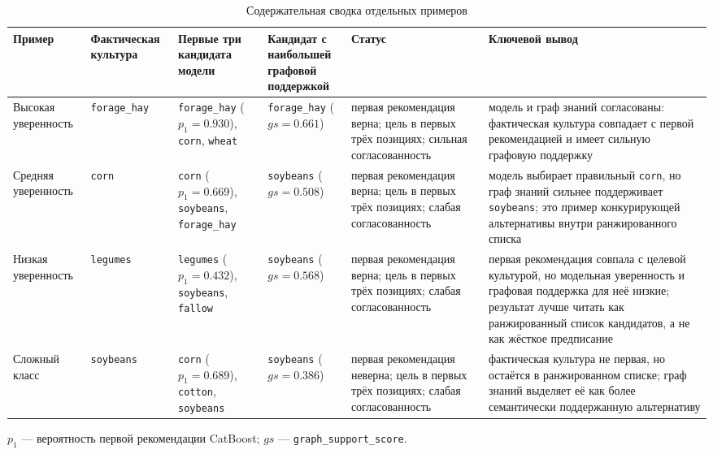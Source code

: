\begin{table}[H]
\centering
\scriptsize
\caption{Содержательная сводка отдельных примеров}
\label{tab:case-studies-summary}
\setlength{\tabcolsep}{1.5pt}
\begin{tabular}{@{}>{\raggedright\arraybackslash}p{}
                >{\raggedright\arraybackslash}p{}
                >{\raggedright\arraybackslash}p{}
                >{\raggedright\arraybackslash}p{}
                >{\raggedright\arraybackslash}p{}
                >{\raggedright\arraybackslash}p{}@{}}
\toprule
Пример & Фактическая культура & Первые три кандидата модели & \makecell[l]{Кандидат с наибольшей\\графовой поддержкой} & Статус & Ключевой вывод \\
\midrule
Высокая уверенность
  & \texttt{forage\_hay}
  & \texttt{forage\_hay} ($p_1=0.930$), \texttt{corn}, \texttt{wheat}
  & \texttt{forage\_hay} ($gs=0.661$)
  & первая рекомендация верна; цель в первых трёх позициях; сильная согласованность
  & модель и граф знаний согласованы: фактическая культура совпадает с первой рекомендацией и имеет сильную графовую поддержку \\
\midrule

Средняя уверенность
  & \texttt{corn}
  & \texttt{corn} ($p_1=0.669$), \texttt{soybeans}, \texttt{forage\_hay}
  & \texttt{soybeans} ($gs=0.508$)
  & первая рекомендация верна; цель в первых трёх позициях; слабая согласованность
  & модель выбирает правильный \texttt{corn}, но граф знаний сильнее поддерживает \texttt{soybeans}; это пример конкурирующей
  альтернативы внутри ранжированного списка \\
\midrule

Низкая уверенность
  & \texttt{legumes}
  & \texttt{legumes} ($p_1=0.432$), \texttt{soybeans}, \texttt{fallow}
  & \texttt{soybeans} ($gs=0.568$)
  & первая рекомендация верна; цель в первых трёх позициях; слабая согласованность
  & первая рекомендация совпала с целевой культурой, но модельная уверенность и графовая поддержка для неё низкие; результат лучше
  читать как ранжированный список кандидатов, а не как жёсткое предписание \\
\midrule

Сложный класс
  & \texttt{soybeans}
  & \texttt{corn} ($p_1=0.689$), \texttt{cotton}, \texttt{soybeans}
  & \texttt{soybeans} ($gs=0.386$)
  & первая рекомендация неверна; цель в первых трёх позициях; слабая согласованность
  & фактическая культура не первая, но остаётся в ранжированном списке; граф знаний выделяет её как более семантически поддержанную
  альтернативу \\
\bottomrule
\end{tabular}

\vspace{0.4em}
\footnotesize $p_1$ --- вероятность первой рекомендации CatBoost; $gs$ --- \texttt{graph\_support\_score}.
\normalsize
\end{table}
